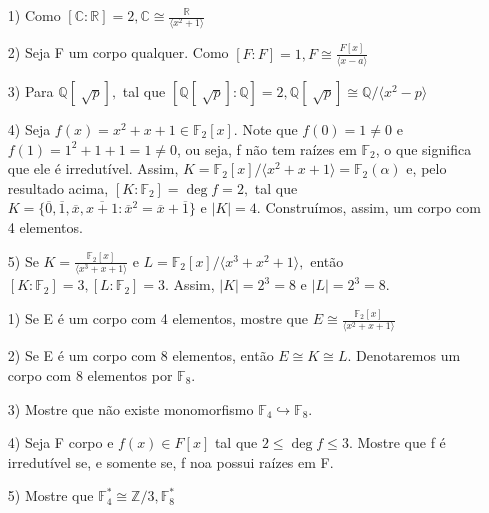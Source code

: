 \documentclass[AlgebraII/algebraII_notes.tex]{subfiles}
\begin{document}
\begin{example}
	\begin{itemize}
		\item[1)] Como \([\mathbb{C}:\mathbb{R}]=2, \mathbb{C}\cong{\frac{\mathbb{R}}{\langle x^{2} + 1 \rangle}}\)
		\item[2)] Seja F um corpo qualquer. Como \([F:F] = 1, F\cong{\frac{F[x]}{\langle x-a \rangle}}\)
		\item[3)] Para \(\mathbb{Q}[\sqrt[]{p}],\) tal que \([\mathbb{Q}[\sqrt[]{p}]:\mathbb{Q}]=2, \mathbb{Q}[\sqrt[]{p}]\cong{\mathbb{Q}/\langle x^{2}-p \rangle}\)
		\item[4)] Seja \(f(x) = x^{2} + x + 1\in \mathbb{F}_{2}[x].\) Note que \(f(0) = 1\neq0\) e \(f(1) = 1^{2} + 1 + 1 = 1\neq0\), ou seja,
		      f não tem raízes em \(\mathbb{F}_{2}\), o que significa que ele é irredutível. Assim, \(K = \mathbb{F}_{2}[x]/\langle x^{2}+x+1 \rangle = \mathbb{F}_{2}(\alpha )\)
		      e, pelo resultado acima, \([K:\mathbb{F}_{2}] = \deg{f} = 2,\) tal que \(K = \{\overline{0}, \overline{1}, \overline{x}, \overline{x+1}: \overline{x}^{2} = \overline{x} + \overline{1}\}\)
		      e \(|K| = 4.\) Construímos, assim, um corpo com 4 elementos.
		\item[5)] Se \(K = \frac{\mathbb{F}_{2}[x]}{\langle x^{3} + x + 1 \rangle}\) e \(L = \mathbb{F}_{2}[x]/\langle x^{3}+x^{2}+1 \rangle,\) então \([K:\mathbb{F}_{2}] = 3, [L:\mathbb{F}_{2}]=3\).
		      Assim, \(|K| = 2^{3} = 8\) e \(|L| = 2^{3} = 8\).
	\end{itemize}
\end{example}
\begin{example}[Exercícios]
	\begin{itemize}
		\item[1)] Se E é um corpo com 4 elementos, mostre que \(E\cong{\frac{\mathbb{F}_{2}[x]}{\langle x^{2}+x+1 \rangle}}\)
		\item[2)] Se E é um corpo com 8 elementos, então \(E\cong{K}\cong{L}.\) Denotaremos um corpo com 8 elementos por \(\mathbb{F}_{8}.\)
		\item[3)] Mostre que não existe monomorfismo \(\mathbb{F}_{4}\hookrightarrow \mathbb{F}_{8}.\)
		\item[4)] Seja F corpo e \(f(x)\in F[x]\) tal que \(2\leq \deg{f}\leq 3\). Mostre que f é irredutível se, e somente se, f noa possui raízes em F.
		\item[5)] Mostre que \(\mathbb{F}_{4}^{*}\cong{\mathbb{Z}/3}, \mathbb{F}_{8}^{*}\)
	\end{itemize}
\end{example}
\end{document}
